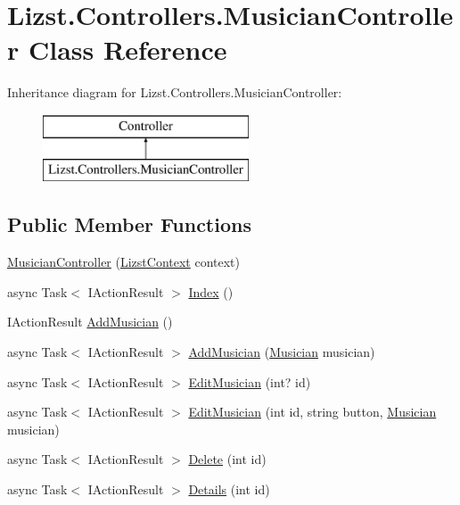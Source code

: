 \hypertarget{class_lizst_1_1_controllers_1_1_musician_controller}{}\section{Lizst.\+Controllers.\+Musician\+Controller Class Reference}
\label{class_lizst_1_1_controllers_1_1_musician_controller}
Inheritance diagram for Lizst.\+Controllers.\+Musician\+Controller\+:\begin{figure}[H]
\begin{center}
\leavevmode
\includegraphics[height=2.000000cm]{class_lizst_1_1_controllers_1_1_musician_controller}
\end{center}
\end{figure}
\subsection*{Public Member Functions}
\begin{DoxyCompactItemize}
\item 
\mbox{\hyperlink{class_lizst_1_1_controllers_1_1_musician_controller_adee0966059bf2440187607b9392916d3}{Musician\+Controller}} (\mbox{\hyperlink{class_lizst_1_1_models_1_1_lizst_context}{Lizst\+Context}} context)
\item 
async Task$<$ I\+Action\+Result $>$ \mbox{\hyperlink{class_lizst_1_1_controllers_1_1_musician_controller_ad59ab2b623a0a08dd579603b9d567a3f}{Index}} ()
\item 
I\+Action\+Result \mbox{\hyperlink{class_lizst_1_1_controllers_1_1_musician_controller_acba048605e697218a6f49f80e6db9467}{Add\+Musician}} ()
\item 
async Task$<$ I\+Action\+Result $>$ \mbox{\hyperlink{class_lizst_1_1_controllers_1_1_musician_controller_acc308021354f46090cea9cc8f2d99c20}{Add\+Musician}} (\mbox{\hyperlink{class_lizst_1_1_models_1_1_musician}{Musician}} musician)
\item 
async Task$<$ I\+Action\+Result $>$ \mbox{\hyperlink{class_lizst_1_1_controllers_1_1_musician_controller_a69a8c275a3691fa60618066476a62466}{Edit\+Musician}} (int? id)
\item 
async Task$<$ I\+Action\+Result $>$ \mbox{\hyperlink{class_lizst_1_1_controllers_1_1_musician_controller_aa7b23ffe4fc7eccb67b59fc1eb9d1edc}{Edit\+Musician}} (int id, string button, \mbox{\hyperlink{class_lizst_1_1_models_1_1_musician}{Musician}} musician)
\item 
async Task$<$ I\+Action\+Result $>$ \mbox{\hyperlink{class_lizst_1_1_controllers_1_1_musician_controller_a765ab694fab808c49fa298679e75dbc6}{Delete}} (int id)
\item 
async Task$<$ I\+Action\+Result $>$ \mbox{\hyperlink{class_lizst_1_1_controllers_1_1_musician_controller_a4461628c5e2ff65bec1c9008c68b9c74}{Details}} (int id)
\end{DoxyCompactItemize}


